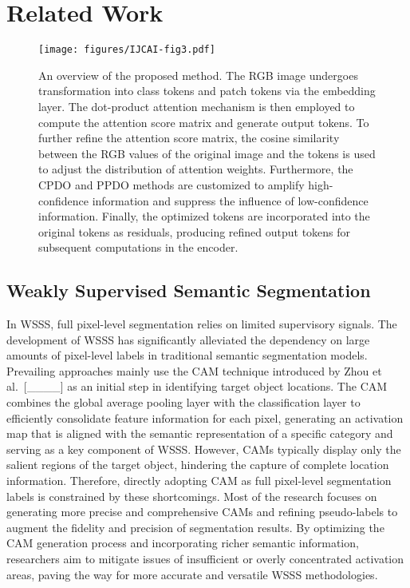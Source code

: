 \section{Related Work}
\begin{figure*}[t] 
    \centering
    \texttt{[image: figures/IJCAI-fig3.pdf]}
    \caption{An overview of the proposed method. The RGB image undergoes transformation into class tokens and patch tokens via the embedding layer. The dot-product attention mechanism is then employed to compute the attention score matrix and generate output tokens. To further refine the attention score matrix, the cosine similarity between the RGB values of the original image and the tokens is used to adjust the distribution of attention weights. Furthermore, the CPDO and PPDO methods are customized to amplify high-confidence information and suppress the influence of low-confidence information. Finally, the optimized tokens are incorporated into the original tokens as residuals, producing refined output tokens for subsequent computations in the encoder.
    }
    \label{Figure 3} 
    \end{figure*}

\subsection{Weakly Supervised Semantic Segmentation}

    In WSSS, full pixel-level segmentation relies on limited supervisory signals. The development of WSSS has significantly alleviated the dependency on large amounts of pixel-level labels in traditional semantic segmentation models. Prevailing approaches mainly use the CAM technique introduced by Zhou et al.~[____] as an initial step in identifying target object locations. The CAM combines the global average pooling layer with the classification layer to efficiently consolidate feature information for each pixel, generating an activation map that is aligned with the semantic representation of a specific category and serving as a key component of WSSS. However, CAMs typically display only the salient regions of the target object, hindering the capture of complete location information. Therefore, directly adopting CAM as full pixel-level segmentation labels is constrained by these shortcomings. Most of the research focuses on generating more precise and comprehensive CAMs and refining pseudo-labels to augment the fidelity and precision of segmentation results. By optimizing the CAM generation process and incorporating richer semantic information, researchers aim to mitigate issues of insufficient or overly concentrated activation areas, paving the way for more accurate and versatile WSSS methodologies.

